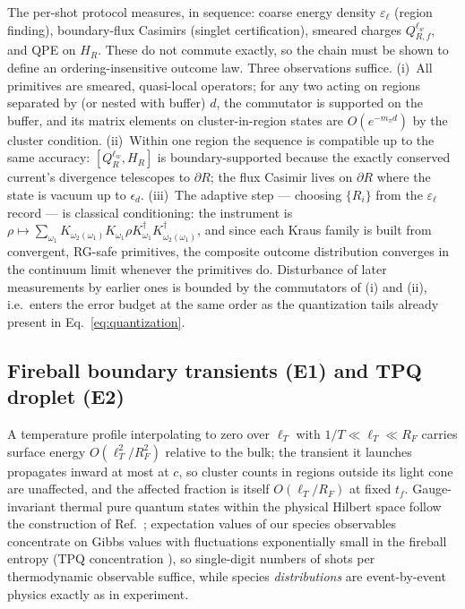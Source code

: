 The per-shot protocol measures, in sequence: coarse energy density
$\varepsilon_\ell$ (region finding), boundary-flux Casimirs (singlet
certification), smeared charges $Q^{\ell_w}_{R,f}$, and QPE on $H_R$.
These do not commute exactly, so the chain must be shown to define an
ordering-insensitive outcome law.  Three observations suffice.
(i)~All primitives are smeared, quasi-local operators; for any two
acting on regions separated by (or nested with buffer) $d$, the
commutator is supported on the buffer, and its matrix elements on
cluster-in-region states are $O(e^{-m_\pi d})$ by the cluster
condition.  (ii)~Within one region the sequence is compatible up to
the same accuracy: $[Q^{\ell_w}_{R},H_R]$ is boundary-supported
because the exactly conserved current's divergence telescopes to
$\partial R$; the flux Casimir lives on $\partial R$ where the state
is vacuum up to $\epsilon_d$.  (iii)~The adaptive step --- choosing
$\{R_i\}$ from the $\varepsilon_\ell$ record --- is classical
conditioning: the instrument is
$\rho \mapsto \sum_{\omega_1} K_{\omega_2(\omega_1)}
K_{\omega_1}\rho K^\dagger_{\omega_1} K^\dagger_{\omega_2(\omega_1)}$,
and since each Kraus family is built from convergent, RG-safe
primitives, the composite outcome distribution converges in the
continuum limit whenever the primitives do.  Disturbance of later
measurements by earlier ones is bounded by the commutators of (i) and
(ii), i.e.\ enters the error budget at the same order as the
quantization tails already present in
Eq.~\eqref{eq:quantization}.

\subsection{Fireball boundary transients (E1) and TPQ droplet (E2)}

A temperature profile interpolating to zero over $\ell_T$ with
$1/T\ll\ell_T\ll R_F$ carries surface energy
$O(\ell_T^2/R_F^2)$ relative to the bulk; the transient it launches
propagates inward at most at $c$, so cluster counts in regions outside
its light cone are unaffected, and the affected fraction is itself
$O(\ell_T/R_F)$ at fixed $t_f$.  Gauge-invariant thermal pure quantum
states within the physical Hilbert space follow the construction of
Ref.~\cite{Davoudi:2022uzo}; expectation values of our species
observables concentrate on Gibbs values with fluctuations exponentially
small in the fireball entropy (TPQ concentration
\cite{Sugiura:2012xw}), so single-digit numbers of shots per
thermodynamic observable suffice, while species \emph{distributions}
are event-by-event physics exactly as in experiment.
